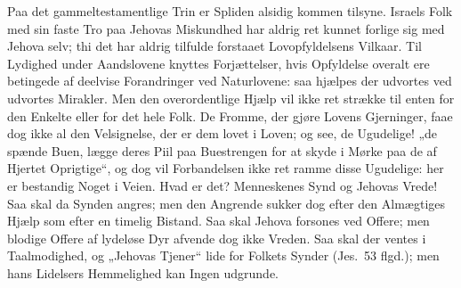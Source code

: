 \documentclass[12pt]{book}
\begin{document}
Paa det gammeltestamentlige Trin er Spliden alsidig kommen tilsyne.
Israels Folk med sin faste Tro paa Jehovas Miskundhed har aldrig ret
kunnet forlige sig med Jehova selv; thi det har aldrig tilfulde
forstaaet Lovopfyldelsens Vilkaar. Til Lydighed under Aandslovene
knyttes Forjættelser, hvis Opfyldelse overalt ere betingede af
deelvise Forandringer ved Naturlovene: saa
hjælpes der udvortes ved udvortes Mirakler. Men den overordentlige
Hjælp vil ikke ret strække til enten for den Enkelte eller for det
hele Folk. De Fromme, der gjøre Lovens Gjerninger, faae dog ikke al
den Velsignelse, der er dem lovet i Loven; og see, de Ugudelige!
„de spænde Buen, lægge deres Piil paa Buestrengen for at skyde i
Mørke paa de af Hjertet Oprigtige“, og dog vil Forbandelsen ikke ret
ramme disse Ugudelige: her er bestandig Noget i Veien. Hvad er det?
Menneskenes Synd og Jehovas Vrede! Saa skal da Synden angres; men
den Angrende sukker dog efter den Almægtiges Hjælp som efter en
timelig Bistand. Saa skal Jehova forsones ved Offere; men blodige
Offere af lydeløse Dyr afvende dog ikke Vreden. Saa skal der ventes
i Taalmodighed, og „Jehovas Tjener“ lide for Folkets Synder
(Jes.\ 53 flgd.); men hans Lidelsers Hemmelighed kan Ingen udgrunde.
\end{document}
